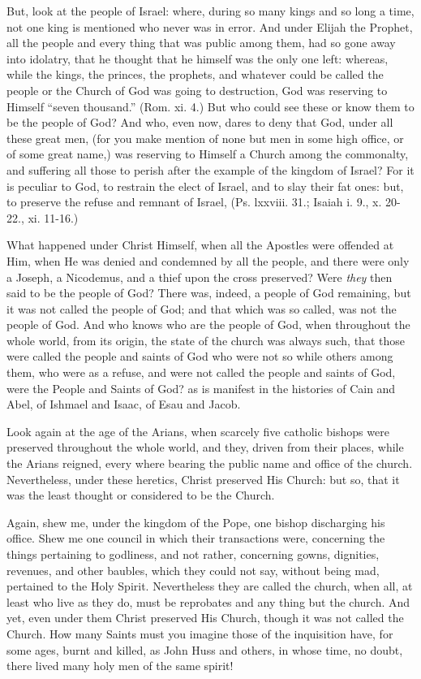 But, look at the people of Israel: where, during so many kings and so long a time, not one king is mentioned who never was in error. And under Elijah the Prophet, all the people and every thing that was public among them, had so gone away into idolatry, that he thought that he himself was the only one left: whereas, while the kings, the princes, the prophets, and whatever could be called the people or the Church of God was going to destruction, God was reserving to Himself “seven thousand.” (Rom. xi. 4.) But who could see these or know them to be the people of God? And who, even now, dares to deny that God, under all these great men, (for you make mention of none but men in some high office, or of some great name,) was reserving to Himself a Church among the commonalty, and suffering all those to perish after the example of the kingdom of Israel? For it is peculiar to God, to restrain the elect of Israel, and to slay their fat ones: but, to preserve the refuse and remnant of Israel, (Ps. lxxviii. 31.; Isaiah i. 9., x. 20-22., xi. 11-16.)

What happened under Christ Himself, when all the Apostles were offended at Him, when He was denied and condemned by all the people, and there were only a Joseph, a Nicodemus, and a thief upon the cross preserved? Were \emph{they }then said to be the people of God? There was, indeed, a people of God remaining, but it was not called the people of God; and that which was so called, was not the people of God. And who knows who are the people of God, when throughout the whole world, from its origin, the state of the church was always such, that those were called the people and saints of God who were not so while others among them, who were as a refuse, and were not called the people and saints of God, were the People and Saints of God? as is manifest in the histories of Cain and Abel, of Ishmael and Isaac, of Esau and Jacob.

Look again at the age of the Arians, when scarcely five catholic bishops were preserved throughout the whole world, and they, driven from their places, while the Arians reigned, every where bearing the public name and office of the church. Nevertheless, under these heretics, Christ preserved His Church: but so, that it was the least thought or considered to be the Church.

Again, shew me, under the kingdom of the Pope, one bishop discharging his office. Shew me one council in which their transactions were, concerning the things pertaining to godliness, and not rather, concerning gowns, dignities, revenues, and other baubles, which they could not say, without being mad, pertained to the Holy Spirit. Nevertheless they are called the church, when all, at least who live as they do, must be reprobates and any thing but the church. And yet, even under them Christ preserved His Church, though it was not called the Church. How many Saints must you imagine those of the inquisition have, for some ages, burnt and killed, as John Huss and others, in whose time, no doubt, there lived many holy men of the same spirit!

